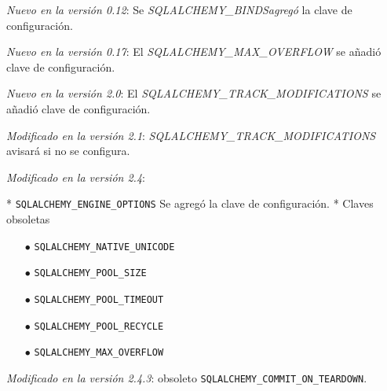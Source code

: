\documentclass[10pt,letterpaper,notumble]{leaflet}
\begin{document}
{\begin{minipage}{1.6\linewidth}
            \textit{Nuevo en la versión 0.12}: Se \textit{SQLALCHEMY\_BINDSagregó} la clave de configuración.
            
            \textit{Nuevo en la versión 0.17}: El \textit{SQLALCHEMY\_MAX\_OVERFLOW} se añadió clave de configuración.
            
            \textit{Nuevo en la versión 2.0}: El \textit{SQLALCHEMY\_TRACK\_MODIFICATIONS} se añadió clave de configuración.
            
            \textit{Modificado en la versión 2.1}: \textit{SQLALCHEMY\_TRACK\_MODIFICATIONS} avisará si no se configura.
            
            \textit{Modificado en la versión 2.4}:
            
            * \texttt{SQLALCHEMY\_ENGINE\_OPTIONS} Se agregó la clave de configuración. * Claves obsoletas
            
            \begin{itemize}
            	\item[$\bullet$] \texttt{SQLALCHEMY\_NATIVE\_UNICODE}
            	
            	\item[$\bullet$] \texttt{SQLALCHEMY\_POOL\_SIZE}
            	
            	\item[$\bullet$] \texttt{SQLALCHEMY\_POOL\_TIMEOUT}
            	
            	\item[$\bullet$] \texttt{SQLALCHEMY\_POOL\_RECYCLE}
            	
            	\item[$\bullet$] \texttt{SQLALCHEMY\_MAX\_OVERFLOW}
            \end{itemize}
            
            \textit{Modificado en la versión 2.4.3}: obsoleto \texttt{SQLALCHEMY\_COMMIT\_ON\_TEARDOWN}.
            
        \end{minipage}
    
    }
    
\end{document}
